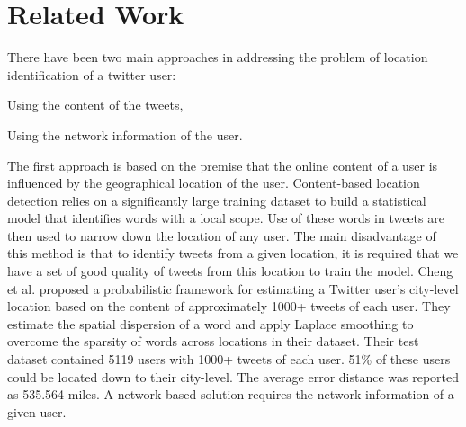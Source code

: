 \section{Related Work}
\label{sec:RelatedWork}
There have been two main approaches in addressing the problem of location identification of a twitter user: \begin{inparaenum}[(1)] 
\item Using the content of the tweets,
\item Using the network information of the user. 
\end{inparaenum}
The first approach is based on the premise that the online content of a user is influenced by the geographical location of the user. Content-based location detection relies on a significantly large training dataset to build a statistical model that identifies words with a local scope. Use of these words in tweets are then used to narrow down the location of any user. The main disadvantage of this method is that to identify tweets from a given location, it is required that we have a set of good quality of tweets from this location to train the model. Cheng et al. \cite{cheng2010you} proposed a probabilistic framework for estimating a Twitter user's city-level location based on the content of approximately 1000+ tweets of each user. They estimate the spatial dispersion of a word and apply Laplace smoothing to overcome the sparsity of words across locations in their dataset. Their test dataset contained 5119 users with 1000+ tweets of each user. 51\%  of these users could be located down to their city-level. The average error distance was reported as 535.564 miles.
A network based solution requires the network information of a given user. 
